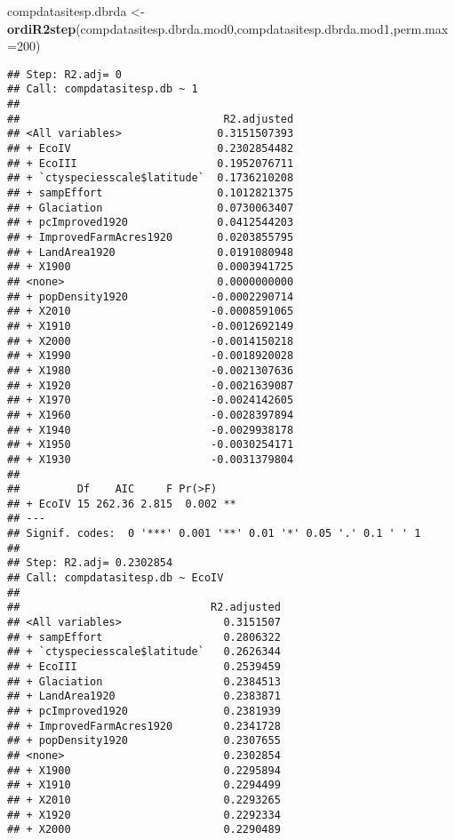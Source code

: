 \documentclass[
]{article}
\newenvironment{Shaded}{\begin{snugshade}}{\end{snugshade}}
\newcommand{\DataTypeTok}[1]{\textcolor[rgb]{0.13,0.29,0.53}{#1}}
\newcommand{\DecValTok}[1]{\textcolor[rgb]{0.00,0.00,0.81}{#1}}
\newcommand{\KeywordTok}[1]{\textcolor[rgb]{0.13,0.29,0.53}{\textbf{#1}}}
\newcommand{\NormalTok}[1]{#1}
\newcommand{\StringTok}[1]{\textcolor[rgb]{0.31,0.60,0.02}{#1}}
\begin{document}
\begin{Shaded}
\begin{Highlighting}[]
\NormalTok{compdatasitesp.dbrda <-}\StringTok{ }\KeywordTok{ordiR2step}\NormalTok{(compdatasitesp.dbrda.mod0,compdatasitesp.dbrda.mod1,}\DataTypeTok{perm.max=}\DecValTok{200}\NormalTok{)}
\end{Highlighting}
\end{Shaded}

\begin{verbatim}
## Step: R2.adj= 0 
## Call: compdatasitesp.db ~ 1 
##  
##                                R2.adjusted
## <All variables>               0.3151507393
## + EcoIV                       0.2302854482
## + EcoIII                      0.1952076711
## + `ctyspeciesscale$latitude`  0.1736210208
## + sampEffort                  0.1012821375
## + Glaciation                  0.0730063407
## + pcImproved1920              0.0412544203
## + ImprovedFarmAcres1920       0.0203855795
## + LandArea1920                0.0191080948
## + X1900                       0.0003941725
## <none>                        0.0000000000
## + popDensity1920             -0.0002290714
## + X2010                      -0.0008591065
## + X1910                      -0.0012692149
## + X2000                      -0.0014150218
## + X1990                      -0.0018920028
## + X1980                      -0.0021307636
## + X1920                      -0.0021639087
## + X1970                      -0.0024142605
## + X1960                      -0.0028397894
## + X1940                      -0.0029938178
## + X1950                      -0.0030254171
## + X1930                      -0.0031379804
## 
##         Df    AIC     F Pr(>F)   
## + EcoIV 15 262.36 2.815  0.002 **
## ---
## Signif. codes:  0 '***' 0.001 '**' 0.01 '*' 0.05 '.' 0.1 ' ' 1
## 
## Step: R2.adj= 0.2302854 
## Call: compdatasitesp.db ~ EcoIV 
##  
##                              R2.adjusted
## <All variables>                0.3151507
## + sampEffort                   0.2806322
## + `ctyspeciesscale$latitude`   0.2626344
## + EcoIII                       0.2539459
## + Glaciation                   0.2384513
## + LandArea1920                 0.2383871
## + pcImproved1920               0.2381939
## + ImprovedFarmAcres1920        0.2341728
## + popDensity1920               0.2307655
## <none>                         0.2302854
## + X1900                        0.2295894
## + X1910                        0.2294499
## + X2010                        0.2293265
## + X1920                        0.2292334
## + X2000                        0.2290489

\end{verbatim}
\end{document}
